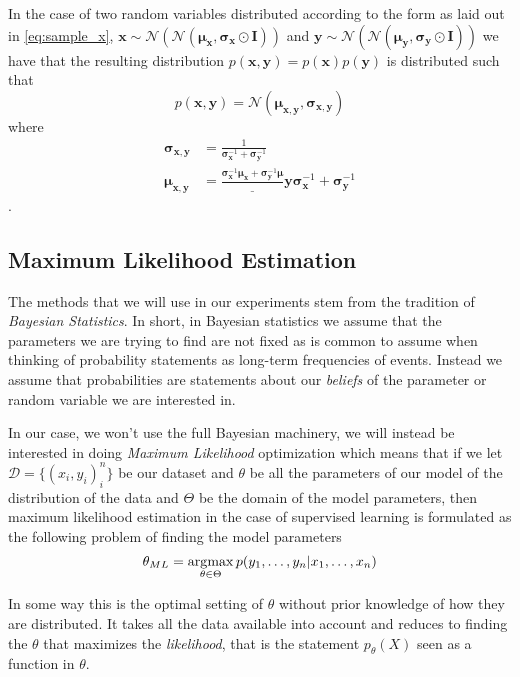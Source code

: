 In the case of two random variables distributed according to the form as laid
out in \ref{eq:sample_x}, $\bm{x} \sim
\mathcal{N}(\mathcal{N}(\bm{\mu}_{\bm{x}}, \bm{\sigma}_{\bm{x}} \odot \bm{I}))$
and $\bm{y} \sim
\mathcal{N}(\mathcal{N}(\bm{\mu}_{\bm{y}}, \bm{\sigma}_{\bm{y}} \odot \bm{I}))$
we have that the resulting distribution $p(\bm{x}, \bm{y}) = p(\bm{x})p(\bm{y})$ is distributed such that
\begin{equation}
  \label{eq:twin_joint_diag_cov}
  p(\bm{x}, \bm{y}) = \mathcal{N}(\bm{\mu}_{\bm{x}, \bm{y}}, \bm{\sigma}_{\bm{x}, \bm{y}})
\end{equation}
where
\begin{align*}
  \bm{\sigma}_{\bm{x}, \bm{y}} & = \frac{1}{\bm{\sigma}_{\bm{x}}^{-1} + \bm{\sigma}_{\bm{y}}^{-1}} \\
  \bm{\mu}_{\bm{x}, \bm{y}} & = \frac{\bm{\sigma}_{\bm{x}}^{-1}\bm{\mu}_{\bm{x}} + \bm{\sigma}_{\bm{y}}^{-1}\bm{\mu}}_{\bm{y}}{\bm{\sigma}_{\bm{x}}^{-1} + \bm{\sigma}_{\bm{y}}^{-1}}
\end{align*}.

\subsection{Maximum Likelihood Estimation}
The methods that we will use in our experiments stem from the tradition of
\textit{Bayesian Statistics}. In short, in Bayesian statistics we assume that
the parameters we are trying to find are not fixed as is common to assume when
thinking of probability statements as long-term frequencies of events. Instead
we assume that probabilities are statements about our \textit{beliefs} of the
parameter or random variable we are interested in.

In our case, we won't use the full Bayesian machinery, we will instead be
interested in doing \textit{Maximum Likelihood} optimization which means that if
we let $\mathcal{D} = \{(x_i, y_i)_i^n\}$ be our dataset and $\theta$ be all the
parameters of our model of the distribution of the data and $\Theta$ be the
domain of the model parameters, then maximum likelihood estimation in the case
of supervised learning is formulated as the following problem of finding the
model parameters
\begin{equation}
  \label{eq:ML_estimate}
  \theta_{ML} = \operatorname*{\arg\!\max}_{\theta \in \Theta}p(y_1, \dots, y_n | x_1, \dots, x_n)
\end{equation}

In some way this is the optimal setting of $\theta$ without prior knowledge of
how they are distributed. It takes all the data available into account and
reduces to finding the $\theta$ that maximizes the \textit{likelihood}, that is
the statement $p_{\theta}(X)$ seen as a function in $\theta$.

